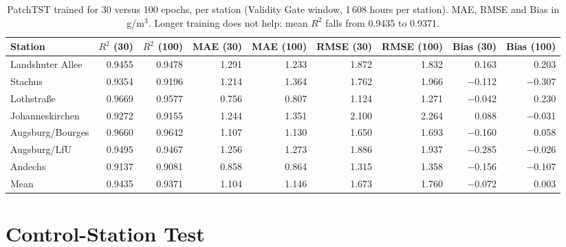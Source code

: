 \begin{table}[!htbp]
\centering\footnotesize\setlength{\tabcolsep}{3pt}
\caption{PatchTST trained for 30 versus 100 epochs, per station (Validity Gate window, 1\,608 hours per station). MAE, RMSE and Bias in \textmu g/m$^3$. Longer training does not help: mean $R^2$ falls from 0.9435 to 0.9371.}
\label{tab:app-patchtst}
\begin{tabular}{lrrrrrrrr}
\toprule
Station & $R^2$ (30) & $R^2$ (100) & MAE (30) & MAE (100) & RMSE (30) & RMSE (100) & Bias (30) & Bias (100) \\
\midrule
Landshuter Allee & 0.9455 & 0.9478 & 1.291 & 1.233 & 1.872 & 1.832 & 0.163 & 0.203 \\
Stachus & 0.9354 & 0.9196 & 1.214 & 1.364 & 1.762 & 1.966 & $-$0.112 & $-$0.307 \\
Lothstra{\ss}e & 0.9669 & 0.9577 & 0.756 & 0.807 & 1.124 & 1.271 & $-$0.042 & 0.230 \\
Johanneskirchen & 0.9272 & 0.9155 & 1.244 & 1.351 & 2.100 & 2.264 & 0.088 & $-$0.031 \\
Augsburg/Bourges & 0.9660 & 0.9642 & 1.107 & 1.130 & 1.650 & 1.693 & $-$0.160 & 0.058 \\
Augsburg/LfU & 0.9495 & 0.9467 & 1.256 & 1.273 & 1.886 & 1.937 & $-$0.285 & $-$0.026 \\
Andechs & 0.9137 & 0.9081 & 0.858 & 0.864 & 1.315 & 1.358 & $-$0.156 & $-$0.107 \\
\midrule
Mean & 0.9435 & 0.9371 & 1.104 & 1.146 & 1.673 & 1.760 & $-$0.072 & 0.003 \\
\bottomrule
\end{tabular}
\end{table}


\FloatBarrier
\section{Control-Station Test}
\label{app:stations}


